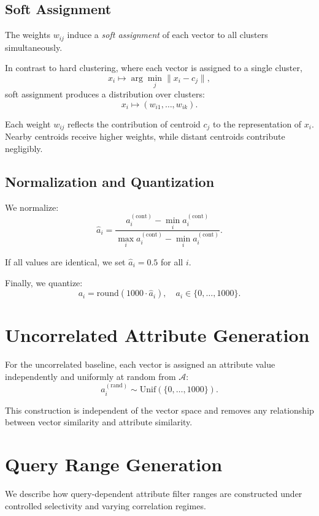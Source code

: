 \subsection{Soft Assignment}

The weights $w_{ij}$ induce a \emph{soft assignment} of each vector to all clusters simultaneously.

In contrast to hard clustering, where each vector is assigned to a single cluster,
\[
x_i \mapsto \arg\min_j \|x_i - c_j\|,
\]
soft assignment produces a distribution over clusters:
\[
x_i \mapsto (w_{i1}, \dots, w_{ik}).
\]

Each weight $w_{ij}$ reflects the contribution of centroid $c_j$ to the representation of $x_i$. Nearby centroids receive higher weights, while distant centroids contribute negligibly.

\subsection{Normalization and Quantization}

We normalize:
\[
\hat{a}_i =
\frac{a_i^{(\mathrm{cont})} - \min_i a_i^{(\mathrm{cont})}}
{\max_i a_i^{(\mathrm{cont})} - \min_i a_i^{(\mathrm{cont})}}.
\]

If all values are identical, we set $\hat{a}_i = 0.5$ for all $i$.

Finally, we quantize:
\[
a_i = \mathrm{round}(1000 \cdot \hat{a}_i), \quad a_i \in \{0,\dots,1000\}.
\]

\section{Uncorrelated Attribute Generation}

For the uncorrelated baseline, each vector is assigned an attribute value independently and uniformly at random from $\mathcal{A}$:
\[
a_i^{(\mathrm{rand})} \sim \mathrm{Unif}(\{0,\dots,1000\}).
\]

This construction is independent of the vector space and removes any relationship between vector similarity and attribute similarity.

\section{Query Range Generation}\label{sec:query-generation}

We describe how query-dependent attribute filter ranges are constructed under controlled selectivity and varying correlation regimes.

